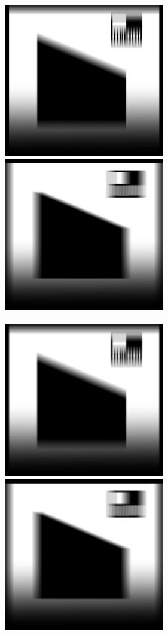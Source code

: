 \documentclass[a4paper,12pt,openany]{report}
\begin{document}
\begin{center}
\\
\includegraphics[width=7cm]{resources/modified/sample/sample_blur_40x1.jpg}
\includegraphics[width=7cm]{resources/modified/sample/sample_blur_1x40.jpg}
\\
\\
\includegraphics[width=7cm]{resources/modified/sample/sample_blur_40x5.jpg}
\includegraphics[width=7cm]{resources/modified/sample/sample_blur_5x40.jpg}
\end{center}
\end{document}
